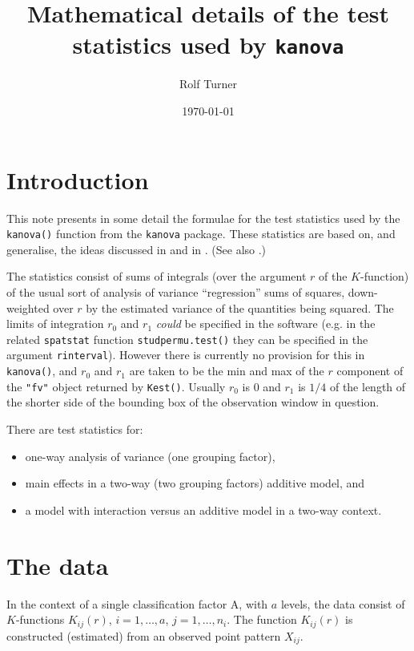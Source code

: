 \documentclass[12pt]{article}
\begin{document}
\title{Mathematical details of the test statistics used by \texttt{kanova}}
\author{Rolf Turner}
\date{\today}
\maketitle

\section{Introduction}
\label{sec:intro}
This note presents in some detail the formulae for the test
statistics used by the \texttt{kanova()} function from the
\texttt{kanova} package.  These statistics are based on, and
generalise, the ideas discussed in \cite{DiggleEtAl2000} and in
\cite{Hahn2012}.  (See also \cite{DiggleEtAl1991}.)

The statistics consist of sums of integrals (over the argument $r$
of the $K$-function) of the usual sort of analysis of variance
``regression'' sums of squares, down-weighted over $r$ by the
estimated variance of the quantities being squared.  The limits
of integration $r_0$ and $r_1$ \emph{could} be specified in
the software (e.g. in the related \texttt{spatstat} function
\texttt{studpermu.test()} they can be specified in the argument
\texttt{rinterval}).  However there is currently no provision
for this in \texttt{kanova()}, and $r_0$ and $r_1$ are taken
to be the min and max of the $r$ component of the \texttt{"fv"}
object returned by \texttt{Kest()}.   Usually $r_0$ is 0 and $r_1$
is $1/4$ of the length of the shorter side of the bounding box of
the observation window in question.

There are test statistics for:
\begin{itemize}
\item one-way analysis of variance (one grouping factor),
\item main effects in a two-way (two grouping factors) additive model, and
\item a model with interaction versus an additive model in a two-way
context.
\end{itemize}

\section{The data}
In the context of a single classification factor A, with $a$ levels,
the data consist of $K$-functions $K_{ij}(r)$, $i = 1, \ldots,
a$, $j = 1, \ldots, n_i$.  The function $K_{ij}(r)$ is constructed
(estimated) from an observed point pattern $X_{ij}$.
\end{document}
